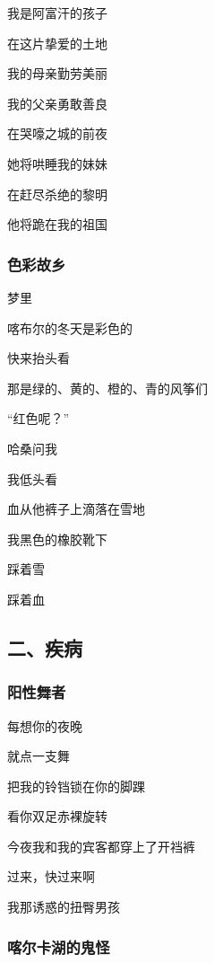 \documentclass[openany,scheme = chinese, linespread = 1.5]{ctexbook}
\begin{document}
\begin{center}
我是阿富汗的孩子

在这片挚爱的土地

我的母亲勤劳美丽

我的父亲勇敢善良

在哭嚎之城的前夜

她将哄睡我的妹妹

在赶尽杀绝的黎明

他将跪在我的祖国
\end{center}

\subsubsection*{色彩故乡}

\begin{center}
梦里

喀布尔的冬天是彩色的

快来抬头看

那是绿的、黄的、橙的、青的风筝们

 “红色呢？”

哈桑问我

我低头看

血从他裤子上滴落在雪地

我黑色的橡胶靴下

踩着雪

踩着血	
\end{center}

\subsection*{二、疾病}

\subsubsection*{阳性舞者}

\begin{center}
每想你的夜晚

就点一支舞

把我的铃铛锁在你的脚踝

看你双足赤裸旋转

今夜我和我的宾客都穿上了开裆裤

过来，快过来啊

我那诱惑的扭臀男孩
\end{center}

\subsubsection*{喀尔卡湖的鬼怪}
\end{document}
